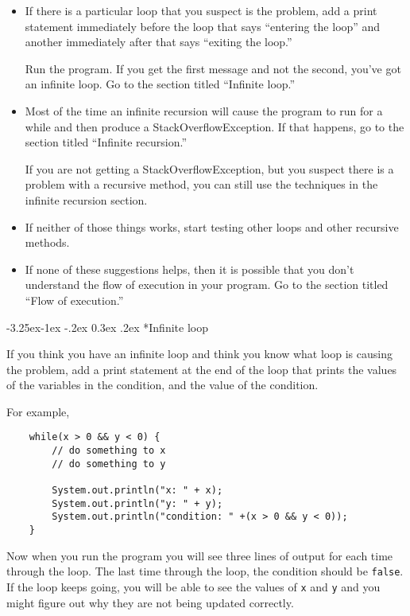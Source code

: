 \documentclass{book}
\makeatletter
\renewcommand\subsubsection{\@startsection {subsubsection}{3}{0mm}%
    {-3.25ex\@plus -1ex \@minus -.2ex}%
    {0.3ex \@plus .2ex}%
    {\normalfont\normalsize\bfseries}}
\makeatother
\begin{document}
\begin{itemize}

\item If there is a particular loop that you suspect is the
problem, add a print statement immediately before the loop
that says
``entering the loop'' and another immediately after that
says ``exiting the loop.''

Run the program.  If you get the first message and not
the second, you've got an infinite loop.  Go to the section
titled ``Infinite loop.''

\item Most of the time an infinite recursion will cause the program
to run for a while and then produce a StackOverflowException.
If that happens, go to the section
titled ``Infinite recursion.''

If you are not getting a StackOverflowException, but you suspect
there is a problem with a recursive method, you can still use
the techniques in the infinite recursion section.

\item If neither of those things works, start testing other
loops and other recursive methods.

\item If none of these suggestions helps, then it is possible that
you don't understand the flow of execution in your program.
Go to the section titled ``Flow of execution.''

\end{itemize}


\subsubsection*{Infinite loop}

If you think you have an infinite loop and think you know
what loop is causing the problem, add a print statement at
the end of the loop that prints the values of the variables in
the condition, and the value of the condition.

For example,

\begin{verbatim}
    while(x > 0 && y < 0) {
        // do something to x
        // do something to y

        System.out.println("x: " + x);
        System.out.println("y: " + y);
        System.out.println("condition: " +(x > 0 && y < 0));
    }
\end{verbatim}
%
Now when you run the program you will see three lines of output
for each time through the loop.  The last time through the
loop, the condition should be {\tt false}.  If the loop keeps
going, you will be able to see the values of {\tt x} and {\tt y}
and you might figure out why they are not being updated correctly.
\end{document}

